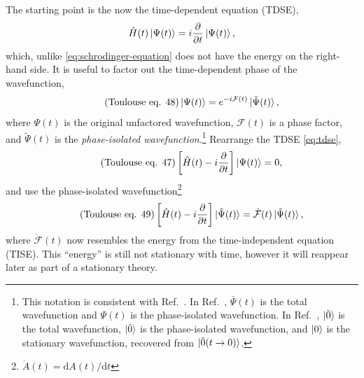 \documentclass[%
class = book,%
crop = false,%
float = true,%
multi = true,%
preview = false,%
]{standalone}
\begin{document}
The starting point is the now the time-dependent \schrod{} equation (TDSE),
\begin{equation}
  \label{eq:tdse}
  \hat{H}(t) \ket{\Psi(t)} = i\frac{\partial}{\partial t} \ket{\Psi(t)},
\end{equation}
which, unlike \eqref{eq:schrodinger-equation} does not have the energy on the right-hand side. It is useful to factor out the time-dependent phase of the wavefunction,
\begin{equation}
  \label{eq:phase-isolated-wavefunction} \tag{Toulouse eq. 48}
  \ket{\Psi(t)} = e^{-i\mathcal{F}(t)} \ket{\tilde{\Psi}(t)},
\end{equation}
where \(\Psi(t)\) is the original unfactored wavefunction, \(\mathcal{F}(t)\) is a phase factor, and \(\tilde{\Psi}(t)\) is the \emph{phase-isolated wavefunction}.\footnote{This notation is consistent with Ref.~\parencite{gauss2000}. In Ref.~\parencite{Toulouse2015}, \(\bar{\Psi}(t)\) is the total wavefunction and \(\Psi(t)\) is the phase-isolated wavefunction. In Ref.~\parencite{Christiansen1998}, \(\ket{\bar{0}}\) is the total wavefunction, \(\ket{\tilde{0}}\) is the phase-isolated wavefunction, and \(\ket{0}\) is the stationary wavefunction, recovered from \(\ket{\tilde{0}(t \rightarrow 0)}\).} Rearrange the TDSE \eqref{eq:tdse},
\begin{equation}
  \label{eq:tdse-rearranged} \tag{Toulouse eq. 47}
  \left[ \hat{H}(t) - i\frac{\partial}{\partial t} \right] \ket{\Psi(t)} = 0,
\end{equation}
and use the phase-isolated wavefunction\footnote{\(\dot{A}(t) = \mathrm{d}A(t)/\mathrm{d}t\)}
\begin{equation}
  \label{eq:phase-isolated-tdse} \tag{Toulouse eq. 49}
  \left[ \hat{H}(t) - i\frac{\partial}{\partial t} \right] \ket{\tilde{\Psi}(t)} = \dot{\mathcal{F}}(t) \ket{\tilde{\Psi}(t)},
\end{equation}
where \(\dot{\mathcal{F}}(t)\) now resembles the energy from the time-independent \schrod{} equation (TISE). This ``energy'' is still not stationary with time, however it will reappear later as part of a stationary theory.
\end{document}
